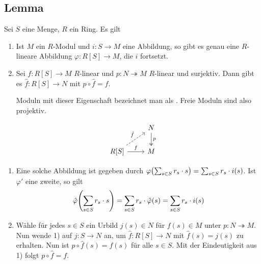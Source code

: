 \subsection[Lemma: Universale Eigenschaft von freien Moduln]{Lemma} %
\label{sub:32}
Sei $S$ eine Menge, $R$ ein Ring. Es gilt\\
\begin{minipage}[c]{0.7\textwidth}
	\begin{enumerate}[1)]
		\item Ist $M$ ein $R$-Modul und $i \colon S \to M$ eine Abbildung, so gibt es genau eine $R$-lineare Abbildung $\varphi \colon R[S] \to M$, die $i$ fortsetzt.
		\item Sei $f\colon R[S]\to M$ $R$-linear und $p\colon N\twoheadrightarrow M$ $R$-linear und surjektiv. Dann gibt es $\hat{f}\colon R[S]\to N$ mit $p\circ \hat{f}=f$.
		
		Moduln mit dieser Eigenschaft bezeichnet man als . Freie Moduln sind also projektiv.
	\end{enumerate}
\end{minipage}\hfill
\begin{minipage}[c]{0.25\textwidth}
	\[
		\begin{tikzcd}
			\mbox{ } & N \dar["p", two heads] \\
			R[S] \rar["f"] \urar["\hat{f}", dashed] & M
		\end{tikzcd}
	\]
\end{minipage}
\begin{enumerate}[1)]
	\item Eine solche Abbildung ist gegeben durch
	\(
		\varphi \enbrace*{\sum_{s \in S} r_s \cdot s} = \sum_{s \in S} r_s \cdot i(s)
	\).
	Ist $\varphi'$ eine zweite, so gilt 
	\begin{align*}
		\hat{\varphi} \enbrace*{\sum_{s \in S} r_s \cdot s}  = \sum_{s \in S} r_s \cdot \hat{\varphi}(s) = \sum_{s  \in S} r_s \cdot i(s)
	\end{align*}
	\item Wähle für jedes $s \in S$ ein Urbild $j(s)\in N$ für $f(s) \in M$ unter $p\colon N \twoheadrightarrow M$. Nun wende 1) auf $j \colon S \to N$ an, um 
	$\hat{f} \colon R[S] \to N$ mit $\hat{f}(s) = j(s)$ zu erhalten. Nun ist $ p \circ \hat{f}(s) = f(s)$ für alle $s \in S$. Mit der Eindeutigkeit aus 1) folgt 
	$p \circ \hat{f} = f$. \bewende
\end{enumerate}

